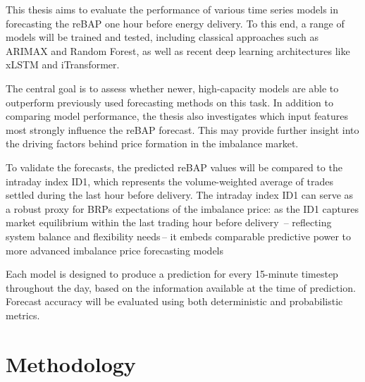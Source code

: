 \documentclass[class=scrbook, crop=false]{standalone}
\begin{document}

This thesis aims to evaluate the performance of various time series models in forecasting the \gls{reBAP} one hour before energy delivery. To this end, a range of models will be trained and tested, including classical approaches such as ARIMAX and Random Forest, as well as recent deep learning architectures like xLSTM and iTransformer.

The central goal is to assess whether newer, high-capacity models are able to outperform previously used forecasting methods on this task. In addition to comparing model performance, the thesis also investigates which input features most strongly influence the \gls{reBAP} forecast. This may provide further insight into the driving factors behind price formation in the imbalance market.

To validate the forecasts, the predicted \gls{reBAP} values will be compared to the intraday index ID1, which represents the volume-weighted average of trades settled during the last hour before delivery.
The intraday index ID1 can serve as a robust proxy for \gls{BRP}s expectations of the imbalance price: as the ID1 captures market equilibrium within the last trading hour before delivery \cite{EPEXIndices} – reflecting system balance and flexibility needs – it embeds comparable predictive power to more advanced imbalance price forecasting models


Each model is designed to produce a prediction for every 15-minute timestep throughout the day, based on the information available at the time of prediction. Forecast accuracy will be evaluated using both deterministic and probabilistic metrics.

\section{Methodology}
\label{Section::Methodology}
\end{document}
